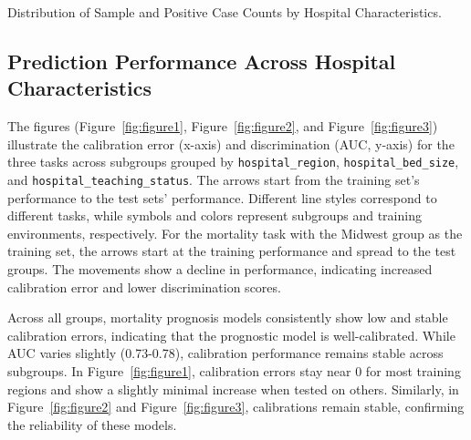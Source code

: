 \documentclass[10.7pt,]{article}
\begin{document}
\begin{table}[ht]
\centering
\caption{Distribution of Sample and Positive Case Counts by Hospital Characteristics.}
\label{tab:Table1}
\end{table}

\subsection{Prediction Performance Across Hospital Characteristics}\label{Prediction Performance Across Hospital Characteristics}

The figures (Figure~\ref{fig:figure1}, Figure~\ref{fig:figure2}, and Figure~\ref{fig:figure3}) illustrate the calibration error (x-axis) and discrimination (AUC, y-axis) for the three tasks across subgroups grouped by \texttt{hospital\_region}, \texttt{hospital\_bed\_size}, and \texttt{hospital\_teaching\_status}. The arrows start from the training set's performance to the test sets' performance. Different line styles correspond to different tasks, while symbols and colors represent subgroups and training environments, respectively. For the mortality task with the Midwest group as the training set, the arrows start at the training performance and spread to the test groups. The movements show a decline in performance, indicating increased calibration error and lower discrimination scores.

Across all groups, mortality prognosis models consistently show low and stable calibration errors, indicating that the prognostic model is well-calibrated. While AUC varies slightly (0.73-0.78), calibration performance remains stable across subgroups. In Figure~\ref{fig:figure1}, calibration errors stay near 0 for most training regions and show a slightly minimal increase when tested on others. Similarly, in Figure~\ref{fig:figure2} and Figure~\ref{fig:figure3}, calibrations remain stable, confirming the reliability of these models.
\end{document}
